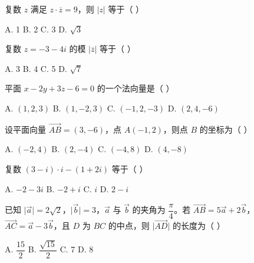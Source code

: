 \documentclass[11pt, a4paper]{article}
\begin{document}
\begin{baitap}[4]
复数 $z$ 满足 $z \cdot \overline{z} = 9$，则 $\lvert z \rvert$ 等于（ ）
\par\vspace{3pt}
\noindent A. 1 \quad B. 2 \quad C. 3 \quad D. $\sqrt{3}$
\end{baitap}

\begin{baitap}[5]
复数 $z = -3 - 4i$ 的模 $\lvert \overline{z} \rvert$ 等于（ ）
\par\vspace{3pt}
\noindent A. 3 \quad B. 4 \quad C. 5 \quad D. $\sqrt{7}$
\end{baitap}

\begin{baitap}[6]
平面 $x - 2y + 3z - 6 = 0$ 的一个法向量是（ ）
\par\vspace{3pt}
\noindent A. $(1,2,3)$ \quad B. $(1,-2,3)$ \quad C. $(-1,2,-3)$ \quad D. $(2,4,-6)$
\end{baitap}

\begin{baitap}[7]
设平面向量 $\overrightarrow{AB} = (3,-6)$，点 $A(-1,2)$，则点 $B$ 的坐标为（ ）
\par\vspace{3pt}
\noindent A. $(-2,4)$ \quad B. $(2,-4)$ \quad C. $(-4,8)$ \quad D. $(4,-8)$
\end{baitap}

\begin{baitap}[8]
复数 $(3 - i) \cdot i - (1 + 2i)$ 等于（ ）
\par\vspace{3pt}
\noindent A. $-2 - 3i$ \quad B. $-2 + i$ \quad C. $i$ \quad D. $2 - i$
\end{baitap}

\begin{baitap}[9]
已知 $\lvert\overrightarrow{a}\rvert = 2\sqrt{2}$，$\lvert\overrightarrow{b}\rvert = 3$，$\overrightarrow{a}$ 与 $\overrightarrow{b}$ 的夹角为 $\dfrac{\pi}{4}$。若 $\overrightarrow{AB} = 5\overrightarrow{a} + 2\overrightarrow{b}$，$\overrightarrow{AC} = \overrightarrow{a} - 3\overrightarrow{b}$，且 $D$ 为 $BC$ 的中点，则 $\lvert\overrightarrow{AD}\rvert$ 的长度为（ ）
\par\vspace{3pt}
\noindent A. $\dfrac{15}{2}$ \quad B. $\dfrac{\sqrt{15}}{2}$ \quad C. 7 \quad D. 8
\end{baitap}
\end{document}
